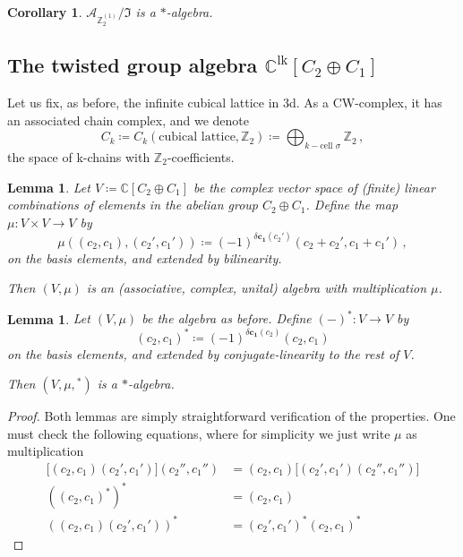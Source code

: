 \documentclass[aps,twocolumn,prx,floatfix,preprintnumbers, nofootinbib,10pt]{revtex4-2}
\numberwithin{equation}{section}
\newtheorem{lemma}[theorem]{Lemma}
\newtheorem{corollary}[theorem]{Corollary}
\theoremstyle{definition}
\theoremstyle{remark}
\theoremstyle{claim}
\newcommand{\be}{\begin{equation}}
\newcommand{\ee}{\end{equation}}
\newcommand{\Z}{{\mathbb Z}}
\newcommand{\mc}[1]{\mathcal{#1}}
\newcommand{\paren}[1]{\left( #1 \right)}
\begin{document}
\begin{corollary}
 $\mc{A}_{\Z_2^{(1)}} / \mathfrak{I}$ is a $*$-algebra.
\end{corollary}

\subsection{The twisted group algebra $\mathbb{C}^\text{lk}[C_2 \oplus C_1]$}

Let us fix, as before, the infinite cubical lattice in 3d. As a CW-complex, it has an associated chain complex, and we denote
\be
C_k \coloneqq C_k(\text{cubical lattice}, \Z_2) \coloneqq \bigoplus_{k-\text{cell } \sigma} \Z_2 \,,
\ee
the space of k-chains with $\Z_2$-coefficients.

\begin{lemma}
 Let $V \coloneqq \mathbb{C}[C_2 \oplus C_1]$ be the complex vector space of (finite) linear combinations of elements in the abelian group $C_2 \oplus C_1$. Define the map $\mu : V \times V \rightarrow V$ by
 \be\label{eq:Clk_multiplication}
 \mu\paren{ (c_2, c_1), (c_2', c_1') } \coloneqq (-1)^{\delta \bm{c_1} (c_2')} (c_2 + c_2', c_1 + c_1') \,,
 \ee
 on the basis elements, and extended by bilinearity.

 Then $(V, \mu)$ is an (associative, complex, unital) algebra with multiplication $\mu$.
\end{lemma}

\begin{lemma}
 Let $(V, \mu)$ be the algebra as before. Define $(-)^{*} : V \rightarrow V$ by
 \be
 (c_2, c_1)^{*} \coloneqq (-1)^{\delta \bm{c_1} (c_2)} (c_2, c_1)
 \ee
 on the basis elements, and extended by \emph{conjugate}-linearity to the rest of $V$.

 Then $(V, \mu, {}^{*})$ is a $*$-algebra.
\end{lemma}

\begin{proof}
 Both lemmas are simply straightforward verification of the properties. One must check the following equations, where for simplicity we just write $\mu$ as multiplication
 \begin{align}
  \big[(c_2, c_1) (c_2', c_1')\big] (c_2'', c_1'') &= (c_2, c_1) \big[(c_2', c_1') (c_2'', c_1'')\big] \\
  \paren{(c_2, c_1)^{*}}^{*} &= (c_2, c_1) \\
  \paren{(c_2, c_1) (c_2', c_1')}^{*} &= (c_2', c_1')^{*} (c_2, c_1)^{*}
 \end{align}
\end{proof}
\end{document}
